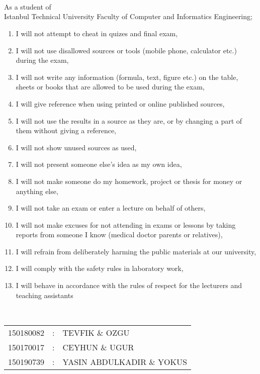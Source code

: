 
\thispagestyle{empty}
\\
\\
\\[0.2cm]
As a student of \\Istanbul Technical University Faculty of Computer and Informatics Engineering;
\begin{enumerate}
    \item I will not attempt to cheat in quizes and final exam,
    \item I will not use disallowed sources or tools (mobile phone, calculator etc.) during the exam,
    \item I will not write any information (formula, text, figure etc.) on the table, sheets or books that are allowed to be used during the exam,
    \item I will give reference when using printed or online published sources,
    \item I will not use the results in a source as they are, or by changing a part of them without giving a reference,
    \item I will not show unused sources as used, 
    \item I will not present someone else’s idea as my own idea, 
    \item I will not make someone do my homework, project or thesis for money or anything else,
    \item I will not take an exam or enter a lecture on behalf of others,
    \item I will not make excuses for not attending in exams or lessons by taking reports from someone I know (medical doctor parents or relatives),
    \item I will refrain from deliberately harming the public materials at our university,  
    \item I will comply with the safety rules in laboratory work,
    \item I will behave in accordance with the rules of respect for the lecturers and teaching assistants
\end{enumerate}
\vspace{-1em}
\\
\vspace{-1em}
\begin{table}[ht]
\centering
\begin{tabular}{rcl}
150180082  & : & TEVFIK \& OZGU \\
150170017  & : & CEYHUN  \& UGUR \\
150190739  & : & YASIN ABDULKADIR \& YOKUS \\
\end{tabular}
\end{table}
\vspace{-1em}
 \begin{table}[ht]
 \begin{tabular}{lr}
\end{tabular}
\end{table}